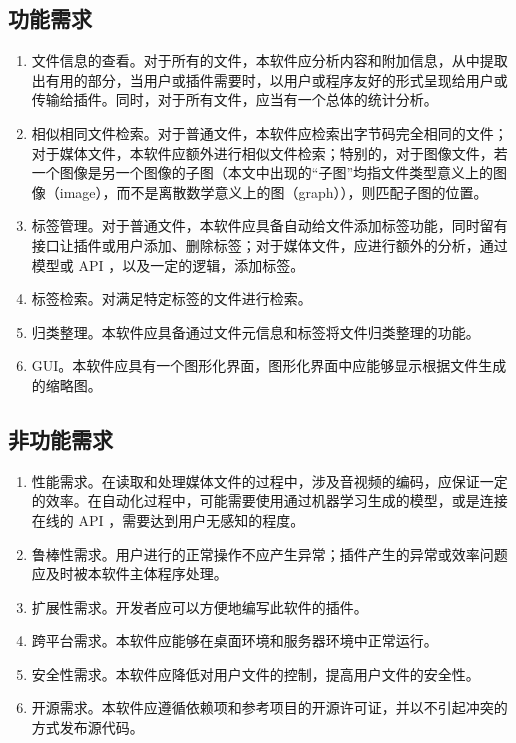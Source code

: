 \subsection{功能需求}

\begin{enumerate}
    \item 文件信息的查看。对于所有的文件，本软件应分析内容和附加信息，从中提取出有用的部分，当用户或插件需要时，以用户或程序友好的形式呈现给用户或传输给插件。同时，对于所有文件，应当有一个总体的统计分析。
    \item 相似相同文件检索。对于普通文件，本软件应检索出字节码完全相同的文件；对于媒体文件，本软件应额外进行相似文件检索；特别的，对于图像文件，若一个图像是另一个图像的子图（本文中出现的“子图”均指文件类型意义上的图像（image），而不是离散数学意义上的图（graph）），则匹配子图的位置。
    \item 标签管理。对于普通文件，本软件应具备自动给文件添加标签功能，同时留有接口让插件或用户添加、删除标签；对于媒体文件，应进行额外的分析，通过模型或 API ，以及一定的逻辑，添加标签。
    \item 标签检索。对满足特定标签的文件进行检索。
    \item 归类整理。本软件应具备通过文件元信息和标签将文件归类整理的功能。
    \item GUI。本软件应具有一个图形化界面，图形化界面中应能够显示根据文件生成的缩略图。
\end{enumerate}

\subsection{非功能需求}

\begin{enumerate}
    \item 性能需求。在读取和处理媒体文件的过程中，涉及音视频的编码，应保证一定的效率。在自动化过程中，可能需要使用通过机器学习生成的模型，或是连接在线的 API ，需要达到用户无感知的程度。
    \item 鲁棒性需求。用户进行的正常操作不应产生异常；插件产生的异常或效率问题应及时被本软件主体程序处理。
    \item 扩展性需求。开发者应可以方便地编写此软件的插件。
    \item 跨平台需求。本软件应能够在桌面环境和服务器环境中正常运行。
    \item 安全性需求。本软件应降低对用户文件的控制，提高用户文件的安全性。
    \item 开源需求。本软件应遵循依赖项和参考项目的开源许可证，并以不引起冲突的方式发布源代码。
\end{enumerate}

